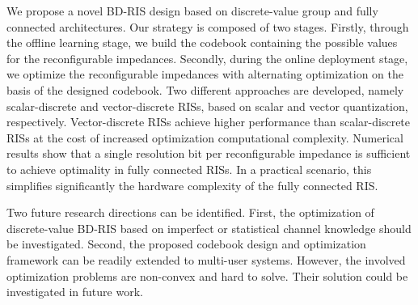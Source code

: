 \documentclass[twocolumn,10pt]{IEEEtran}
\begin{document}
We propose a novel BD-RIS design based on discrete-value group and fully connected architectures.
Our strategy is composed of two stages.
Firstly, through the offline learning stage, we build the codebook containing the possible values for the reconfigurable impedances.
Secondly, during the online deployment stage, we optimize the reconfigurable impedances with alternating optimization on the basis of the designed codebook.
Two different approaches are developed, namely scalar-discrete and vector-discrete RISs, based on scalar and vector quantization, respectively.
Vector-discrete RISs achieve higher performance than scalar-discrete RISs at the cost of increased optimization computational complexity.
Numerical results show that a single resolution bit per reconfigurable impedance is sufficient to achieve optimality in fully connected RISs.
In a practical scenario, this simplifies significantly the hardware complexity of the fully connected RIS.

Two future research directions can be identified.
First, the optimization of discrete-value BD-RIS based on imperfect or statistical channel knowledge should be investigated.
Second, the proposed codebook design and optimization framework can be readily extended to multi-user systems.
However, the involved optimization problems are non-convex and hard to solve.
Their solution could be investigated in future work.
\end{document}
